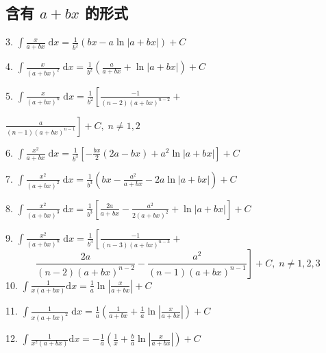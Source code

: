 \subsection{含有 \(a + {bx}\) 的形式}

3. \(\int \frac{x}{a + {bx}}\mathrm{\;d}x = \frac{1}{{b}^{2}}\left( {{bx} - a\ln \left| {a + {bx}}\right| }\right)  + C\)

4. \(\int \frac{x}{{\left( a + bx\right) }^{2}}\mathrm{\;d}x = \frac{1}{{b}^{2}}\left( {\frac{a}{a + {bx}} + \ln \left| {a + {bx}}\right| }\right)  + C\)

5. \(\int \frac{x}{{\left( a + bx\right) }^{n}}\mathrm{\;d}x = \frac{1}{{b}^{2}}\left\lbrack  {\frac{-1}{\left( {n - 2}\right) {\left( a + bx\right) }^{n - 2}} + }\right.\)

\(\left. \frac{a}{\left( {n - 1}\right) {\left( a + bx\right) }^{n - 1}}\right\rbrack   + C,\;n \neq  1,2\)

6. \(\int \frac{{x}^{2}}{a + {bx}}\mathrm{\;d}x = \frac{1}{{b}^{3}}\left\lbrack  {-\frac{bx}{2}\left( {{2a} - {bx}}\right)  + {a}^{2}\ln \left| {a + {bx}}\right| }\right\rbrack   + C\)

7. \(\int \frac{{x}^{2}}{{\left( a + bx\right) }^{2}}\mathrm{\;d}x = \frac{1}{{b}^{3}}\left( {{bx} - \frac{{a}^{2}}{a + {bx}} - {2a}\ln \left| {a + {bx}}\right| }\right)  + C\)

8. \(\int \frac{{x}^{2}}{{\left( a + bx\right) }^{3}}\mathrm{\;d}x = \frac{1}{{b}^{3}}\left\lbrack  {\frac{2a}{a + {bx}} - \frac{{a}^{2}}{2{\left( a + bx\right) }^{2}} + \ln \left| {a + {bx}}\right| }\right\rbrack   + C\)

9. \(\int \frac{{x}^{2}}{{\left( a + bx\right) }^{n}}\mathrm{\;d}x = \frac{1}{{b}^{3}}\left\lbrack  {\frac{-1}{\left( {n - 3}\right) {\left( a + bx\right) }^{n - 3}} + }\right.\)
\[
\left. {\frac{2a}{\left( {n - 2}\right) {\left( a + bx\right) }^{n - 2}} - \frac{{a}^{2}}{\left( {n - 1}\right) {\left( a + bx\right) }^{n - 1}}}\right\rbrack   + C,\;n \neq  1,2,3
\]
10. \(\int \frac{1}{x\left( {a + {bx}}\right) }\mathrm{d}x = \frac{1}{a}\ln \left| \frac{x}{a + {bx}}\right|  + C\)

11. \(\int \frac{1}{x{\left( a + bx\right) }^{2}}\mathrm{\;d}x = \frac{1}{a}\left( {\frac{1}{a + {bx}} + \frac{1}{a}\ln \left| \frac{x}{a + {bx}}\right| }\right)  + C\)

12. \(\int \frac{1}{{x}^{2}\left( {a + {bx}}\right) }\mathrm{d}x =  - \frac{1}{a}\left( {\frac{1}{x} + \frac{b}{a}\ln \left| \frac{x}{a + {bx}}\right| }\right)  + C\)

